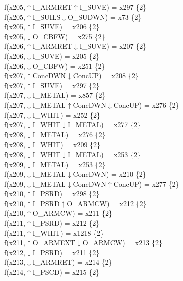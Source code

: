 f(x205,$\uparrow$I\_ARMRET$\uparrow$I\_SUVE) = x297 \{2\} \\  
f(x205,$\uparrow$I\_SUILS$\downarrow$O\_SUDWN) = x73 \{2\} \\  
f(x205,$\uparrow$I\_SUVE) = x206 \{2\} \\  
f(x205,$\downarrow$O\_CBFW) = x275 \{2\} \\  
f(x206,$\uparrow$I\_ARMRET$\downarrow$I\_SUVE) = x207 \{2\} \\  
f(x206,$\downarrow$I\_SUVE) = x205 \{2\} \\  
f(x206,$\downarrow$O\_CBFW) = x251 \{2\} \\  
f(x207,$\uparrow$ConcDWN$\downarrow$ConcUP) = x208 \{2\} \\  
f(x207,$\uparrow$I\_SUVE) = x297 \{2\} \\  
f(x207,$\downarrow$I\_METAL) = x857 \{2\} \\  
f(x207,$\downarrow$I\_METAL$\uparrow$ConcDWN$\downarrow$ConcUP) = x276 \{2\} \\  
f(x207,$\downarrow$I\_WHIT) = x252 \{2\} \\  
f(x207,$\downarrow$I\_WHIT$\downarrow$I\_METAL) = x277 \{2\} \\  
f(x208,$\downarrow$I\_METAL) = x276 \{2\} \\  
f(x208,$\downarrow$I\_WHIT) = x209 \{2\} \\  
f(x208,$\downarrow$I\_WHIT$\downarrow$I\_METAL) = x253 \{2\} \\  
f(x209,$\downarrow$I\_METAL) = x253 \{2\} \\  
f(x209,$\downarrow$I\_METAL$\downarrow$ConcDWN) = x210 \{2\} \\  
f(x209,$\downarrow$I\_METAL$\downarrow$ConcDWN$\uparrow$ConcUP) = x277 \{2\} \\  
f(x210,$\uparrow$I\_PSRD) = x298 \{2\} \\  
f(x210,$\uparrow$I\_PSRD$\uparrow$O\_ARMCW) = x212 \{2\} \\  
f(x210,$\uparrow$O\_ARMCW) = x211 \{2\} \\  
f(x211,$\uparrow$I\_PSRD) = x212 \{2\} \\  
f(x211,$\uparrow$I\_WHIT) = x1218 \{2\} \\  
f(x211,$\uparrow$O\_ARMEXT$\downarrow$O\_ARMCW) = x213 \{2\} \\  
f(x212,$\downarrow$I\_PSRD) = x211 \{2\} \\  
f(x213,$\downarrow$I\_ARMRET) = x214 \{2\} \\  
f(x214,$\uparrow$I\_PSCD) = x215 \{2\} \\  
